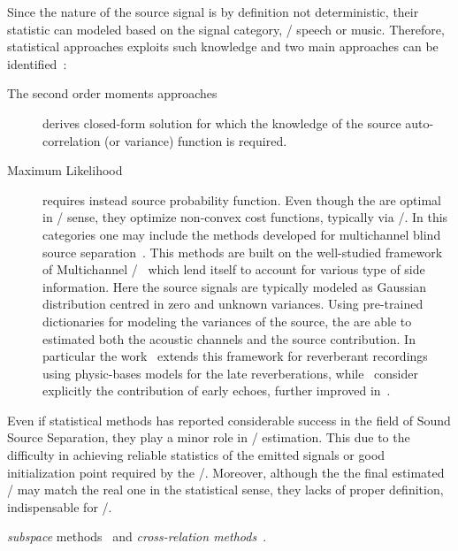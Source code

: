 \mynewline
Since the nature of the source signal is by definition not deterministic, their statistic can modeled based on the signal category, \eg/ speech or music.
Therefore, statistical approaches exploits such knowledge and two main approaches can be identified~:
\begin{description}
    \item[The second order moments approaches] derives closed-form solution for which the knowledge of the source auto-correlation (or variance) function is required.
    \item[Maximum Likelihood] requires instead source probability function.
    Even though the are optimal in \ML/ sense, they optimize non-convex cost functions, typically via \EMdef/.
    In this categories one may include the methods developed for multichannel blind source separation~.
    This methods are built on the well-studied framework of Multichannel \NMF/~ which lend itself to account for various type of side information.
    Here the source signals are typically modeled as Gaussian distribution centred in zero and unknown variances.
    Using pre-trained dictionaries for modeling the variances of the source, the are able to estimated both the acoustic channels and the source contribution.
    In particular the work~ extends this framework for reverberant recordings using physic-bases models for the late reverberations, while~ consider explicitly the contribution of early echoes, further improved in~.
\end{description}
Even if statistical methods has reported considerable success in the field of Sound Source Separation, they play a minor role in \RIR/ estimation.
This due to the difficulty in achieving reliable statistics of the emitted signals or good initialization point required by the \EM/.
Moreover, although the the final estimated \RIRs/ may match the real one in the statistical sense, they lacks of proper definition, indispensable for \AER/.

 \textit{subspace} methods~ and \textit{cross-relation methods}~.

